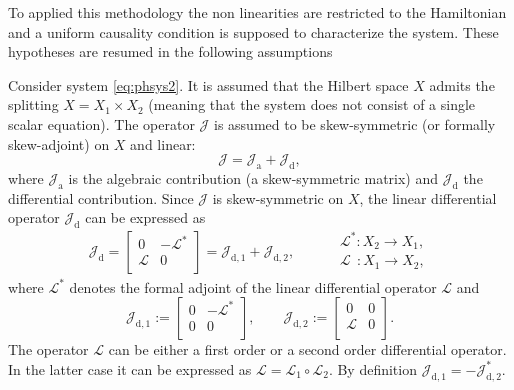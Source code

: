 To applied this methodology the non linearities are restricted to the Hamiltonian and a uniform causality condition is supposed to characterize the system. These hypotheses are resumed in the following assumptions

\begin{assumption}\label{ass:linJ}
	Consider system \eqref{eq:phsys2}. It is assumed that the Hilbert space $X$ admits the splitting $X = X_1 \times X_2$ (meaning that the system does not consist of a single scalar equation). The operator $\mathcal{J}$ is assumed to be skew-symmetric (or formally skew-adjoint) on $X$ and linear:
	\begin{equation}\label{eq:assJ}
	\mathcal{J} = \mathcal{J}_{\text{a}} + \mathcal{J}_{\text{d}},
	\end{equation}
	where $\mathcal{J}_{\text{a}}$ is the algebraic contribution (a skew-symmetric matrix) and $\mathcal{J}_{\text{d}}$ the differential contribution. Since $\mathcal{J}$ is skew-symmetric on $X$, the linear differential operator $\mathcal{J}_{\text{d}}$ can be expressed as
	\begin{equation}\label{eq:assJd}
	\mathcal{J}_{\text{d}} = 
	\begin{bmatrix}
	0 & -\mathcal{L}^* \\
	\mathcal{L} & 0 \\
	\end{bmatrix} = \mathcal{J}_{\text{d}, 1} + \mathcal{J}_{\text{d}, 2}, \qquad 
	\begin{aligned}
	&\mathcal{L}^* : X_2 \rightarrow X_1, \\
	&\mathcal{L}\;\, : X_1 \rightarrow X_2, \\
	\end{aligned}
	\end{equation}
	where $\mathcal{L}^*$ denotes the formal adjoint of the linear differential operator $\mathcal{L}$ and 
	\begin{equation*}
		\mathcal{J}_{\text{d}, 1}:= \begin{bmatrix}
		0 & -\mathcal{L}^* \\
		0 & 0 \\
		\end{bmatrix}, \qquad 
		\mathcal{J}_{\text{d}, 2} := \begin{bmatrix}
		0 & 0 \\
		\mathcal{L} & 0 \\
		\end{bmatrix}.
	\end{equation*}
	The operator $\mathcal{L}$ can be either a first order or a second order differential operator. In the latter case it can be expressed as $\mathcal{L} = \mathcal{L}_1 \circ \mathcal{L}_2$. By definition $\mathcal{J}_{\text{d}, 1} = - \mathcal{J}_{\text{d}, 2}^*$.
\end{assumption}

